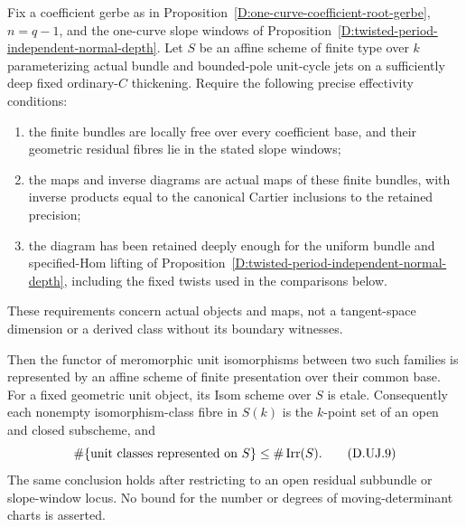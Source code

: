 \begin{proposition}
\label{D:finite-jet-unit-Isom}
Fix a coefficient gerbe as in
Proposition~\ref{D:one-curve-coefficient-root-gerbe},
$n=q-1$, and the one-curve slope windows of
Proposition~\ref{D:twisted-period-independent-normal-depth}.
Let $S$ be an affine scheme of finite type over $k$
parameterizing actual bundle and bounded-pole unit-cycle
jets on a sufficiently deep fixed ordinary-$C$ thickening.
Require the following precise effectivity conditions:
\begin{enumerate}
\item the finite bundles are locally free over every
coefficient base, and their geometric residual fibres lie
in the stated slope windows;
\item the maps and inverse diagrams are actual maps of
these finite bundles, with inverse products equal to the
canonical Cartier inclusions to the retained precision;
\item the diagram has been retained deeply enough for the
uniform bundle and specified-Hom lifting of
Proposition~\ref{D:twisted-period-independent-normal-depth},
including the fixed twists used in the comparisons below.
\end{enumerate}
These requirements concern actual objects and maps, not
a tangent-space dimension or a derived class without its
boundary witnesses.

Then the functor of meromorphic unit isomorphisms between
two such families is represented by an affine scheme of
finite presentation over their common base. For a fixed
geometric unit object, its Isom scheme over $S$ is etale.
Consequently each nonempty isomorphism-class fibre in $S(k)$
is the $k$-point set of an open and closed subscheme, and
\[
 \#\{\hbox{unit classes represented on }S\}
                            \leq\#\operatorname{Irr}(S).
                                                               \tag{D.UJ.9}
\]
The same conclusion holds after restricting to an open
residual subbundle or slope-window locus. No bound for the
number or degrees of moving-determinant charts is asserted.
\end{proposition}

